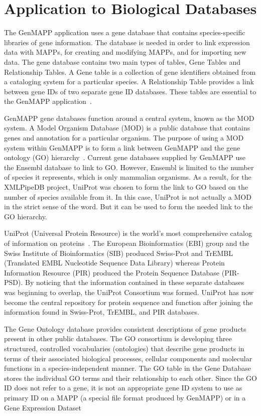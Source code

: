 \section{Application to Biological Databases}
\label{biodb}
The GenMAPP application uses a gene database that contains species-specific
libraries of gene information.  The database is needed in order to link expression
data with MAPPs, for creating and modifying MAPPs, and for importing new data.
The gene database contains two main types of tables, Gene Tables and Relationship
Tables.  A Gene table is a collection of gene identifiers obtained from a
cataloging system for a particular species.  A Relationship Table provides a link
between gene IDs of two separate gene ID databases.  These tables are essential to
the GenMAPP application~\cite{noSupport}.

GenMAPP gene databases function around a central system, known as the MOD system.
A Model Organism Database (MOD) is a public database that contains genes and
annotation for a particular organism.
The purpose of using a MOD system within GenMAPP is to form a link between
GenMAPP and the gene ontology (GO) hierarchy~\cite{noSupport}.  Current gene
databases supplied by GenMAPP use the Ensembl database to link to GO.  However,
Ensembl is limited to the number of species it represents, which is only
mammalian organisms.
As a result, for the XMLPipeDB project, UniProt was chosen to form the link to GO
based on the number of species available from it.  In this case, UniProt is not
actually a MOD in the strict sense of the word.  But it can be used to form the
needed link to the GO hierarchy.

UniProt (Universal Protein Resource) is the world's most comprehensive catalog of
information on proteins~\cite{uniprotWeb}.
The European Bioinformatics (EBI) group and the
Swiss Institute of Bioinformatics (SIB) produced Swiss-Prot and TrEMBL
(Translated EMBL Nucleotide Sequence Data Library)
whereas
Protein Information Resource (PIR) produced the Protein Sequence Database (PIR-PSD).
By noticing that the information contained in these separate databases was beginning
to overlap, the UniProt Consortium was formed.
UniProt has now become the central repository
for protein sequence and function after joining the information found in
Swiss-Prot, TrEMBL, and PIR databases.

The Gene Ontology database provides consistent descriptions of gene products present
in other public databases. The GO consortium is developing three structured, controlled
vocabularies (ontologies) that describe gene products in
terms of their associated biological processes, cellular components and molecular functions
in a species-independent manner. The GO table in the Gene Database stores the individual
GO terms and their relationship to each other. Since the GO ID does not refer to a gene,
it is not an appropriate gene ID system to use as primary ID on a MAPP 
(a special file format produced by GenMAPP) or in a Gene Expression Dataset~\cite{genmapp.com}
